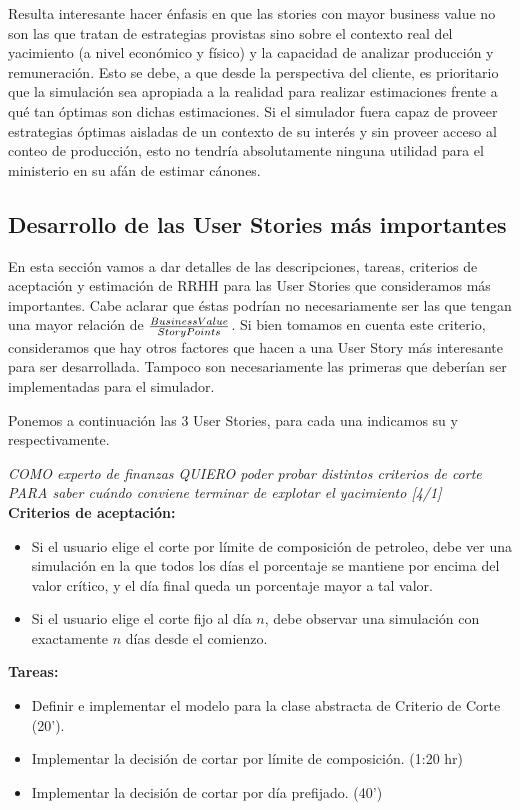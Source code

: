 Resulta interesante hacer énfasis en que las stories con mayor business value no son las que tratan de estrategias provistas sino sobre el contexto real del yacimiento (a nivel económico y físico) y la capacidad de analizar producción y remuneración. Esto se debe, a que desde la perspectiva del cliente, es prioritario que la simulación sea apropiada a la realidad para realizar estimaciones frente a qué tan óptimas son dichas estimaciones. Si el simulador fuera capaz de proveer estrategias óptimas aisladas de un contexto de su interés y sin proveer acceso al conteo de producción, esto no tendría absolutamente ninguna utilidad para el ministerio en su afán de estimar cánones.

\newpage
\subsection{Desarrollo de las User Stories más importantes}

En esta sección vamos a dar detalles de las descripciones, tareas, criterios de aceptación y estimación de RRHH para las User Stories que consideramos más importantes. Cabe aclarar que éstas podrían no necesariamente ser las que tengan una mayor relación de \( \frac{Business Value{}}{Story Points{}} \). Si bien tomamos en cuenta este criterio, consideramos que hay otros factores que hacen a una User Story más interesante para ser desarrollada. Tampoco son necesariamente las primeras que deberían ser implementadas para el simulador. 

Ponemos a continuación las 3 User Stories, para cada una indicamos su
\BV{} y \SP{} respectivamente.

\begin{tcolorbox}
\textit{COMO experto de finanzas QUIERO poder probar distintos criterios de corte PARA saber cuándo conviene terminar de explotar el yacimiento [4/1]}\\

\textbf{Criterios de aceptación:}
\begin{itemize}
	\item Si el usuario elige el corte por límite de composición de petroleo, debe ver una simulación en la que todos los días el porcentaje se mantiene por encima del valor crítico, y el día final queda un porcentaje mayor a tal valor.
    \item Si el usuario elige el corte fijo al día $n$, debe observar una simulación con exactamente $n$ días desde el comienzo.
\end{itemize}

\textbf{Tareas:}
\begin{itemize}
	\item Definir e implementar el modelo para la clase abstracta de
    Criterio de Corte (20').
    \item Implementar la decisión de cortar por límite de composición. (1:20 hr)
    \item Implementar la decisión de cortar por día prefijado. (40')
\end{itemize}
\end{tcolorbox}

